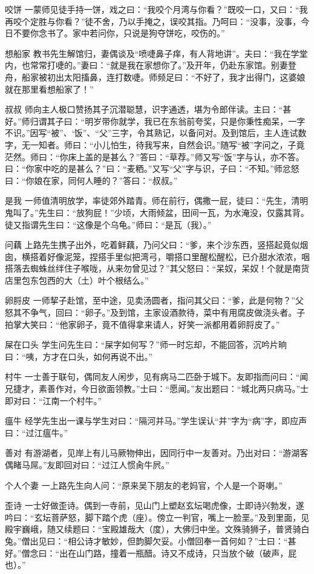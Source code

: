 \documentclass[12pt,UTF8]{ctexbook}
\begin{document}
咬饼
一蒙师见徒手持一饼，戏之曰：“我咬个月湾与你看？”既咬一口，又曰：“我再咬个定胜与你看？”徒不舍，乃以手掩之，误咬其指。乃呵曰：“没事，没事，今日不要你念书了。家中若问你，只说是狗夺饼吃，咬伤的。”

想船家
教书先生解馆归，妻偶谈及“喷啑鼻子痒，有人背地讲”。夫曰：“我在学堂内，也常常打啑的。”妻曰：“就是我在家想你了。”及开年，仍赴东家馆。别妻登舟，船家被初出太阳搐鼻，连打数啑。师频足曰：“不好了，我才出得门，这婆娘就在那里看想船家了！”

叔叔
师向主人极口赞扬其子沉潜聪慧，识字通透，堪为令郎伴读。主曰：“甚好。”师归谓其子曰：“明岁带你就学，我已在东翁前夸奖，只是你秉性痴呆，一字不识。”因写“被”、‘饭”、“父”三字，令其熟记，以备问对。及到馆后，主人连试数字，无一知者。师曰：“小儿怕生，待我写来，自然会识。”随写“被”字问之，子竟茫然。师曰：“你床上盖的是甚么？”答曰：“草荐。”师又写“饭”字与认，亦不答。曰：“你家中吃的是甚么？”曰：“麦粞。”又写“父”字与识，子曰：“不知。”师忿怒曰：“你娘在家，同何人睡的？”答曰：“叔叔。”

是我
一师值清明放学，率徒郊外踏青。师在前行，偶撒一屁，徒曰：“先生，清明鬼叫了。”先生曰：“放狗屁！”少顷，大雨倾盆，田间一瓦，为水淹没，仅露其背。徒又指谓先生曰：“这像是个乌龟。”师曰：“是瓦（我）。”

问藕
上路先生携子出外，吃着鲜藕，乃问父曰：“爹，来个沙东西，竖搭起竟似烟囱，横搭着好像泥笼，捏搭手里似把湾弓，嚼搭口里醒松醒松，已介甜水浓浓，咽搭落去蜘蛛丝绊住子喉咙，从来勿曾见过？”其父怒曰：“呆奴，呆奴！个就是南货店里包东包西的大（土）叶个根结么。”

卵脟皮
一师挈子赴馆，至中途，见卖汤圆者，指问其父曰：“爹，此是何物？”父怒其不争气，回曰：“卵子。”及到馆，主家设酒款待，菜中有用腐皮做浇头者。子拍掌大笑曰：“他家卵子，竟不值得拿来请人，好笑一派都用着卵脟皮了。”

屎在口头
学生问先生曰：“屎字如何写？”师一时忘却，不能回答，沉吟片晌曰：“咦，方才在口头，如何再说不出。”

村牛
一士善于联句，偶同友人闲步，见有病马二匹卧于城下。友即指而问曰：“闻兄捷才，素善作对，今日欲面领教。”士曰：“愿闻。”友出题曰：“城北两只病马。”士即对曰：“江南一个村牛。”

瘟牛
经学先生出一课与学生对曰：“隔河并马。”学生误认“并”字为“病”字，即应声曰：“过江瘟牛。”

善对
有游湖者，见岸上有儿马厥物伸出，因同行中一友善对。乃出对曰：“游湖客偶睹马屌。”友即回对曰：“过江人惯肏牛屄。”

个人个妻
一上路先生向人问：“原来吴下朋友的老妈官，个人是一个哥喇。”

歪诗
一士好做歪诗。偶到一寺前，见山门上塑赵玄坛喝虎像，士即诗兴勃发，遂吟曰：“玄坛菩萨怒，脚下踏个虎（座）。傍立一判官，嘴上一脸垩。”及到里面，见殿宇巍峨，随又续题曰：“宝殿雄哉大（度），大佛归中坐。文殊骑狮子，普贤骑白兔。”僧出见曰：“相公诗才敏妙，但韵脚欠妥。小僧回奉一首何如？”士曰：“甚好。”僧念曰：“出在山门路，撞着一瓶醋。诗又不成诗，只当放个破（破声，屁也）。”
\end{document}
